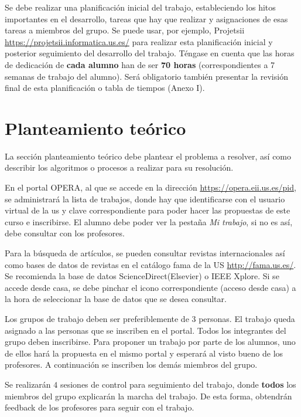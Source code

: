 \documentclass{pid}
\begin{document}
Se debe realizar una planificación inicial del trabajo, estableciendo los hitos importantes en el desarrollo, tareas que hay que realizar y asignaciones de esas tareas a miembros del grupo. Se puede usar, por ejemplo, Projetsii \url{https://projetsii.informatica.us.es/} para realizar esta planificación inicial y posterior seguimiento del desarrollo del trabajo. Téngase en cuenta que las horas de dedicación de {\bf cada alumno} han de ser {\bf 70 horas} (correspondientes a 7 semanas de trabajo del alumno). Será obligatorio también presentar la revisión final de esta planificación o tabla de tiempos (Anexo I).

\section{Planteamiento teórico}

La sección planteamiento teórico debe plantear el problema a resolver, así como describir los algoritmos o procesos a realizar para su resolución.

En el portal OPERA, al que se accede en la dirección \url{https://opera.eii.us.es/pid}, se administrará la lista de trabajos, donde hay que identificarse con el usuario virtual de la us y clave correspondiente para poder hacer las propuestas de este curso e inscribirse. El alumno debe poder ver la pestaña {\it Mi trabajo}, si no es así, debe consultar con los profesores.

Para la búsqueda de artículos, se pueden consultar revistas internacionales así como bases de datos de revistas en el catálogo fama de la US \url{http://fama.us.es/}. Se recomienda la base de datos ScienceDirect(Elsevier) o IEEE Xplore. Si se accede desde casa, se debe pinchar el icono correspondiente (acceso desde casa) a la hora de seleccionar la base de datos que se desea consultar.

Los grupos de trabajo deben ser preferiblemente de $3$ personas. El trabajo queda asignado a las personas que se inscriben en el portal. Todos los integrantes del grupo deben inscribirse. Para proponer un trabajo por parte de los alumnos, uno de ellos hará la propuesta en el mismo portal y esperará al visto bueno de los profesores. A continuación se inscriben los demás miembros del grupo.

Se realizarán $4$ sesiones de control para seguimiento del trabajo, donde {\bf todos} los miembros del grupo explicarán la marcha del trabajo. De esta forma, obtendrán feedback de los profesores para seguir con el trabajo.
\end{document}
